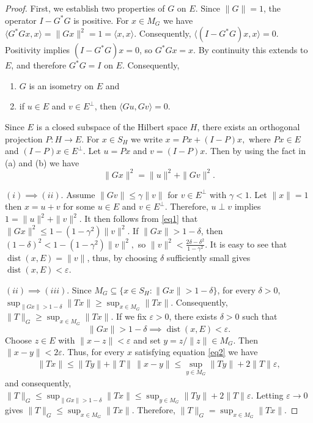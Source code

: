 \documentclass[10pt,a4paper]{amsart}
\begin{document}
	\begin{proof}
		First, we establish two properties of $G$ on $E$. Since $\|G\|=1$, the operator $I-G^*G$ is positive. For $x\in M_G$ we have $\langle G^*Gx,x\rangle=\|Gx\|^2=1=\langle x, x\rangle.$ Consequently, $\langle (I-G^*G)x,x\rangle=0$. Positivity implies $(I-G^*G)x=0$, so $G^*Gx=x$. By continuity this extends to $E$, and therefore $G^*G=I$ on $E.$ Consequently,
		\begin{enumerate}
			\item[(a)] $G$ is an isometry on $E$ and
			\item[(b)] if $u\in E$ and $v\in E^\perp$, then $\langle Gu,Gv\rangle=0$.
		\end{enumerate}
		Since $E$ is a closed subspace of the Hilbert space $H$, there exists an orthogonal projection $P:H\to E$. For $x\in S_H$ we write $x = Px + (I-P)x,$ where $Px\in E$ and $(I-P)x\in E^\perp$. Let $u=Px$ and $v=(I-P)x$. Then by using the fact in (a) and (b) we have
		\begin{equation}\label{eq1}
			\|Gx\|^2=\|u\|^2+\|Gv\|^2 .
		\end{equation}
		
		
		\medskip
		\noindent
		$(i)\implies (ii)$. Assume $\|Gv\|\le \gamma\|v\|$ for $v\in E^\perp$ with $\gamma<1$. Let $\|x\|=1$ then $x=u+v$ for some $u\in E$ and $v\in E^\perp$. Therefore, $u\perp v$ implies $1=\|u\|^2+\|v\|^2$. It then follows from \eqref{eq1} that $\|Gx\|^2\le 1-(1-\gamma^2)\|v\|^2.$ If $\|Gx\|>1-\delta$, then $(1-\delta)^2<1-(1-\gamma^2)\|v\|^2,$ so $\|v\|^2<\frac{2\delta-\delta^2}{1-\gamma^2}.$ It is easy to see that $\operatorname{dist}(x, E)=\|v\|$, thus, by choosing $\delta$ sufficiently small gives $\operatorname{dist}(x,E)<\varepsilon$.
		
		
		
		\medskip
		
		\noindent
		$(ii)\implies (iii).$ Since $M_G \subseteq \{x\in S_H:\|Gx\|>1-\delta\}$, for every $\delta>0$, $\sup_{\|Gx\|>1-\delta}\|Tx\|\ge \sup_{x\in M_G}\|Tx\|.$ Consequently, $\|T\|_G \ge \sup_{x\in M_G}\|Tx\|$. If we fix $\varepsilon>0$, there exists $\delta>0$ such that
		\begin{equation}\label{eq2}
			\|Gx\|>1-\delta \implies \operatorname{dist}(x,E)<\varepsilon.
		\end{equation}
		Choose $z\in E$ with $\|x-z\|<\varepsilon$ and set $y=z/\|z\|\in M_G$. Then $\|x-y\|<2\varepsilon$. Thus, for every $x$ satisfying equation \eqref{eq2} we have 
		\begin{align*}
			\|Tx\|\le \|Ty\| + \|T\|\,\|x-y\|\leq \sup_{y\in M_G}\|Ty\|+2\|T\|\varepsilon,
		\end{align*}
		and consequently, $\|T\|_G \le \sup_{\|Gx\|>1-\delta}\|Tx\| \le \sup_{y\in M_G}\|Ty\|+2\|T\|\varepsilon$. Letting $\varepsilon\to0$ gives $\|T\|_G \le \sup_{x\in M_G}\|Tx\|$. Therefore, $\|T\|_G = \sup_{x\in M_G}\|Tx\|$. 
		

\end{proof}
\end{document}
